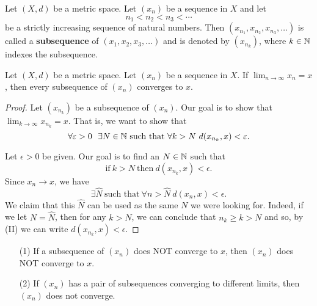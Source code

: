 \documentclass[a4paper]{book}
\begin{document}
\begin{definition}[Subsequence]
    Let \( (X,d) \) be a metric space. Let \( ({x}_{n}) \) be a sequence in \( X  \) and let 
    \[  {n}_{1} < {n}_{2} < {n}_{3} < \cdots    \]
    be a strictly increasing sequence of natural numbers. Then \( ({x}_{{n}_{1}}, {x}_{{n}_{2}}, {x}_{{n}_{3}}, \dots ) \) is called a \textbf{subsequence} of \( ({x}_{1}, {x}_{2}, {x}_{3}, \dots ) \) and is denoted by \( ({x}_{{n}_{k }}) \), where \( k \in \mathbb{N}  \) indexes the subsequence.
\end{definition}

\begin{theorem}[ ]
    Let \( (X,d) \) be a metric space. Let \( ({x}_{n}) \) be a sequence in \( X  \). If \( \lim_{ n \to \infty  } {x}_{n} = x  \), then every subsequence of \( ({x}_{n}) \) converges to \( x  \).
\end{theorem}

\begin{proof}
Let \( ({x}_{{n}_{k }}) \) be a subsequence of \( ({x}_{n}) \). Our goal is to show that \( \lim_{ k  \to  \infty  }  {x}_{{n}_{k }} = x  \). That is, we want to show that 
\[  \forall \varepsilon > 0 \ \ \exists N \in \mathbb{N} \ \text{such that} \ \forall k > N \  d({x}_{{n}_{k }}, x) < \varepsilon.  \]

Let \( \epsilon > 0  \) be given. Our goal is to find an \( N \in \mathbb{N}  \) such that
\[ \text{if} \ k > N \ \text{then} \ d({x}_{{n}_{k }}, x) < \epsilon. \tag{I} \]
Since \( {x}_{n} \to x  \), we have
\[  \exists \hat{N} \ \text{such that} \ \forall n > \hat{N} \ d({x}_{n}, x) < \epsilon. \tag{II} \]
We claim that this \( \hat{N} \) can be used as the same \( N  \) we were looking for. Indeed, if we let \( N = \hat{N} \), then for any \( k > N  \), we can conclude that \( {n}_{k} \geq k > N  \) and so, by (II) we can write \( d({x}_{{n}_{k}},x) < \epsilon \).
\end{proof}

\begin{corollary}
    \begin{enumerate}
        \item[(1)] If  a subsequence of \( ({x}_{n}) \) does NOT converge to \( x  \), then \( ({x}_{n})  \) does NOT converge to \( x  \).
        \item[(2)] If \( ({x}_{n})  \) has a pair of subsequences converging to different limits, then \( ({x}_{n}) \) does not converge.
    \end{enumerate}
\end{corollary}
\end{document}
